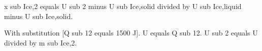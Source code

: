 x sub Ice,2 equals U sub 2 minus U sub Ice,solid divided by U sub Ice,liquid minus U sub Ice,solid.  

With substitution [Q sub 12 equals 1500 J].  
U equals Q sub 12.  
U sub 2 equals U divided by m sub Ice,2.